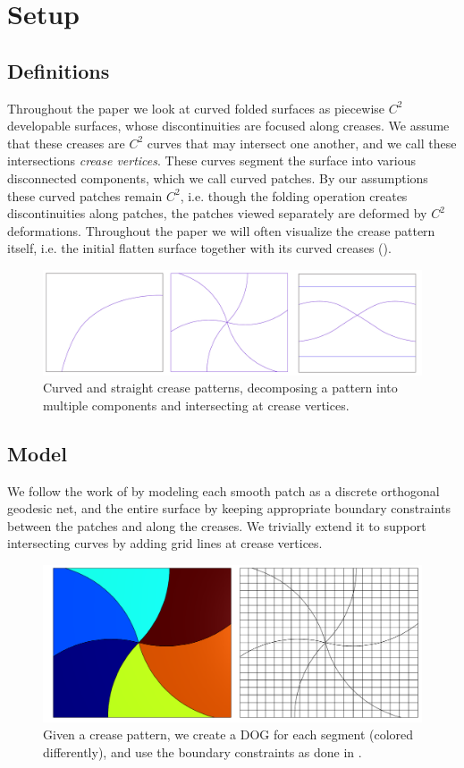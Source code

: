 \section{Setup} \label{sec:pre}
\subsection{Definitions}
Throughout the paper we look at curved folded surfaces as piecewise $C^2$ developable surfaces, whose discontinuities are focused along creases. We assume that these creases are $C^2$ curves that may intersect one another, and we call these intersections \textit{crease vertices}. These curves segment the surface into various disconnected components, which we call curved patches. By our assumptions these curved patches remain $C^2$, i.e. though the folding operation creates discontinuities along patches, the patches viewed separately are deformed by $C^2$ deformations. Throughout the paper we will often visualize the crease pattern itself, i.e. the initial flatten surface together with its curved creases ().
\begin{figure} [h]
	\centering
	\includegraphics[width=\linewidth]{figures/crease_patterns}
	\caption{Curved and straight crease patterns, decomposing a pattern into multiple components and intersecting at crease vertices.}
	\label{fig:crease_pattern}
\end{figure}

\subsection{Model}
We follow the work of \cite{rabi2018shape} by modeling each smooth patch as a discrete orthogonal geodesic net, and the entire surface by keeping appropriate boundary constraints between the patches and along the creases. We trivially extend it to support intersecting curves by adding grid lines at crease vertices.

\begin{figure} [h]
	\centering
	\includegraphics[width=0.8\linewidth]{figures/piecewise_dog_from_crease}
	\caption{Given a crease pattern, we create a DOG for each segment (colored differently), and use the boundary constraints as done in \cite{rabi2018shape}.}
	\label{fig:piecewise_dog_from_crease}
\end{figure}

